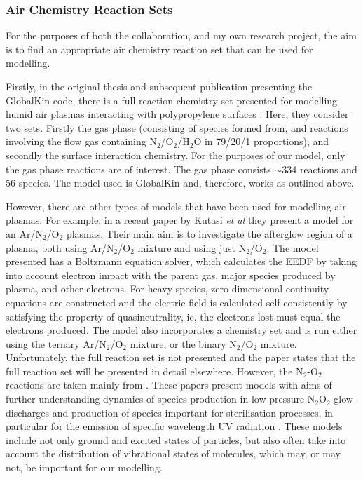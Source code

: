 \documentclass[11pt, oneside]{article}   	%
\begin{document}
\subsubsection{Air Chemistry Reaction Sets}
For the purposes of both the collaboration, and my own research project, the aim is to find an appropriate air chemistry reaction set that can be used for modelling.

Firstly, in the original thesis and subsequent publication presenting the GlobalKin code, there is a full reaction chemistry set presented for modelling humid air plasmas interacting with polypropylene surfaces \cite{Dorai2002modeling, Dorai2003a}.
Here, they consider two sets.
Firstly the gas phase (consisting of species formed from, and reactions involving the flow gas containing N$_2$/O$_2$/H$_2$O in 79/20/1 proportions), and secondly the surface interaction chemistry. 
For the purposes of our model, only the gas phase reactions are of interest.
The gas phase consists $\sim$334 reactions and 56 species. 
The model used is GlobalKin and, therefore, works as outlined above.

However, there are other types of models that have been used for modelling air plasmas.
For example, in a recent paper by Kutasi \textit{et al} \cite{Kutasi2016tuning} they present a model for an Ar/N$_2$/O$_2$ plasmas.
Their main aim is to investigate the afterglow region of a plasma, both using Ar/N$_2$/O$_2$ mixture and using just N$_2$/O$_2$.
The model presented has a Boltzmann equation solver, which calculates the EEDF by taking into account electron impact with the parent gas, major species produced by plasma, and other electrons.
For heavy species, zero dimensional continuity equations are constructed and the electric field is calculated self-consistently by satisfying the property of quasineutrality, ie, the electrons lost must equal the electrons produced.
The model also incorporates a chemistry set and is run either using the ternary Ar/N$_2$/O$_2$ mixture, or the binary N$_2$/O$_2$ mixture.
Unfortunately, the full reaction set is not presented and the paper states that the full reaction set will be presented in detail elsewhere.
However, the N$_2$-O$_2$ reactions are taken mainly from \cite{Guerra1997self, Pintassilgo2005modelling, Kutasi2008modelling}.
These papers present models with aims of further understanding dynamics of species production in low pressure N$_2$O$_2$ glow-discharges \cite{Guerra1997self} and production of species important for sterilisation processes, in particular for the emission of specific wavelength UV radiation \cite{Pintassilgo2005modelling, Kutasi2008modelling}.
These models include not only ground and excited states of particles, but also often take into account the distribution of vibrational states of molecules, which may, or may not, be important for our modelling.
\end{document}
